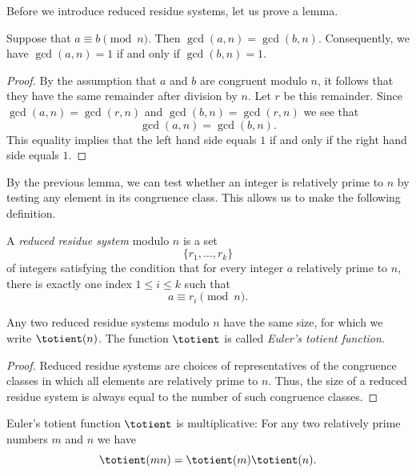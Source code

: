 Before we introduce reduced residue systems, let us prove a lemma.

\begin{lemma}
  Suppose that $a\equiv b\pmod{n}$. Then $\gcd(a,n)=\gcd(b,n)$. Consequently, we have $\gcd(a,n)=1$ if and only if $\gcd(b,n)=1$.
\end{lemma}

\begin{proof}
  By the assumption that $a$ and $b$ are congruent modulo $n$, it follows that they have the same remainder after division by $n$. Let $r$ be this remainder. Since $\gcd(a,n)=\gcd(r,n)$ and $\gcd(b,n)=\gcd(r,n)$ we see that
  \begin{equation*}
    \gcd(a,n)=\gcd(b,n).
  \end{equation*}
  This equality implies that the left hand side equals $1$ if and only if the right hand side equals $1$.
\end{proof}

By the previous lemma, we can test whether an integer is relatively prime to $n$ by testing any element in its congruence class. This allows us to make the following definition.

\begin{definition}
  A \emph{reduced residue system} modulo $n$ is a set
  \begin{equation*}
    \{r_1,\ldots,r_k\}
  \end{equation*}
  of integers satisfying the condition that for every integer $a$ relatively prime to $n$, there is exactly one index $1\leq i\leq k$ such that
  \begin{equation*}
    a\equiv r_i\pmod{n}.
  \end{equation*}
\end{definition}

\begin{corollary}
  Any two reduced residue systems modulo $n$ have the same size, for which we write $\totient(n)$. The function $\totient$ is called \emph{Euler's totient function}.
\end{corollary}

\begin{proof}
  Reduced residue systems are choices of representatives of the congruence classes in which all elements are relatively prime to $n$. Thus, the size of a reduced residue system is always equal to the number of such congruence classes.
\end{proof}

\begin{theorem}\label{theorem:multiplicative-totient}
  Euler's totient function $\totient$ is multiplicative: For any two relatively prime numbers $m$ and $n$ we have
  \begin{equation*}
    \totient(mn)=\totient(m)\totient(n).
  \end{equation*}
\end{theorem}

